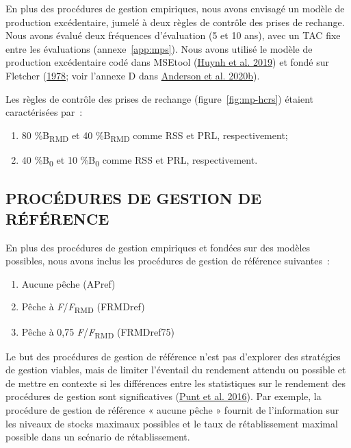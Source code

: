 \documentclass[french,11pt]{book}
\begin{document}
En plus des procédures de gestion empiriques, nous avons envisagé un modèle de production excédentaire, jumelé à deux règles de contrôle des prises de rechange. Nous avons évalué deux fréquences d'évaluation (5 et 10 ans), avec un TAC fixe entre les évaluations (annexe~\ref{app:mps}). Nous avons utilisé le modèle de production excédentaire codé dans MSEtool (\protect\hyperlink{ref-huynh_msetool_2019}{Huynh et al. 2019}) et fondé sur Fletcher (\protect\hyperlink{ref-fletcher1978}{1978}; voir l'annexe D dans \protect\hyperlink{ref-anderson2020gfmp}{Anderson et al. 2020b}).

Les règles de contrôle des prises de rechange (figure~\ref{fig:mp-hcrs}) étaient caractérisées par~:
\begin{enumerate}
\def\labelenumi{\arabic{enumi}.}

\item
  80 \%B\textsubscript{RMD} et 40 \%B\textsubscript{RMD} comme RSS et PRL, respectivement;
\item
  40 \%B\textsubscript{0} et 10 \%B\textsubscript{0} comme RSS et PRL, respectivement.
\end{enumerate}
\hypertarget{procuxe9dures-de-gestion-de-ruxe9fuxe9rence}{%
\subsection{PROCÉDURES DE GESTION DE RÉFÉRENCE}\label{procuxe9dures-de-gestion-de-ruxe9fuxe9rence}}

En plus des procédures de gestion empiriques et fondées sur des modèles possibles, nous avons inclus les procédures de gestion de référence suivantes~:
\begin{enumerate}
\def\labelenumi{\arabic{enumi}.}

\item
  Aucune pêche (APref)
\item
  Pêche à \emph{F}/\emph{F}\textsubscript{RMD} (FRMDref)
\item
  Pêche à 0,75 \emph{F}/\emph{F}\textsubscript{RMD} (FRMDref75)
\end{enumerate}
Le but des procédures de gestion de référence n'est pas d'explorer des stratégies de gestion viables, mais de limiter l'éventail du rendement attendu ou possible et de mettre en contexte si les différences entre les statistiques sur le rendement des procédures de gestion sont significatives (\protect\hyperlink{ref-punt2016}{Punt et al. 2016}). Par exemple, la procédure de gestion de référence « aucune pêche » fournit de l'information sur les niveaux de stocks maximaux possibles et le taux de rétablissement maximal possible dans un scénario de rétablissement.
\end{document}
